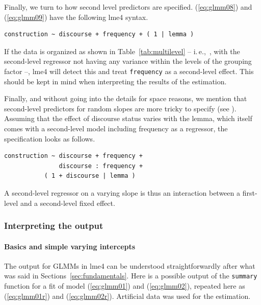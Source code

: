 \documentclass[a4paper,12pt]{article}
\newcommand{\ie}{i.\,e.,\ }
\begin{document}
Finally, we turn to how second level predictors are specified.
(\ref{eq:glmm08}) and (\ref{eq:glmm09}) have the following lme4 syntax.

\vspace{0.5\baselineskip}

\begin{lstlisting}[frame=trbl]
construction ~ discourse + frequency + ( 1 | lemma )
\end{lstlisting}

If the data is organized as shown in Table~\ref{tab:multilevel} -- \ie, with the second-level regressor not having any variance within the levels of the grouping factor --, lme4 will detect this and treat \texttt{frequency} as a second-level effect.
This should be kept in mind when interpreting the results of the estimation.

Finally, and without going into the details for space reasons, we mention that second-level predictors for random slopes are more tricky to specify (see \citealt[280-282]{GelmanHill2006}).
Assuming that the effect of discourse status varies with the lemma, which itself comes with a second-level model including frequency as a regressor, the specification looks as follows.

\vspace{0.5\baselineskip}

\begin{lstlisting}[frame=trbl]
construction ~ discourse + frequency +
               discourse : frequency +
	       ( 1 + discourse | lemma )
\end{lstlisting}

A second-level regressor on a varying slope is thus an interaction between a first-level and a second-level fixed effect.

\subsubsection{Interpreting the output}
\label{sec:interpretingtheoutput}

\paragraph{Basics and simple varying intercepts}

The output for GLMMs in lme4 can be understood straightforwardly after what was said in Sections~\ref{sec:fundamentals}.
Here is a possible output of the \texttt{summary} function for a fit of model (\ref{eq:glmm01}) and (\ref{eq:glmm02}), repeated here as (\ref{eq:glmm01r}) and (\ref{eq:glmm02r}).
Artificial data was used for the estimation.
\end{document}
